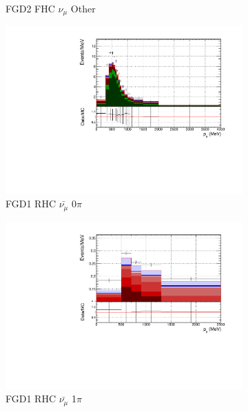 \begin{figure}
\begin{subfigure}{.32\textwidth}
  \caption{FGD2 FHC $\nu_{\mu}$ Other}
  \label{fig:pstack_FGD2_numuCC_other}
\end{subfigure}
\centering
\begin{subfigure}{.32\textwidth}
  \centering
  \includegraphics[width=0.95\linewidth]{figs/FGD1_anti-numuCC_0pi_p}
  \caption{FGD1 RHC $\bar{\nu_{\mu}}$ 0$\pi$}
  \label{fig:pstack_FGD1_anti-numuCC_0pi}
\end{subfigure}
\begin{subfigure}{.32\textwidth}
  \centering
  \includegraphics[width=0.95\linewidth]{figs/FGD1_anti-numuCC_1pi_p}
  \caption{FGD1 RHC $\bar{\nu_{\mu}}$ 1$\pi$}
  \label{fig:pstack_pstack_FGD1_anti-numuCC_1pi}
\end{subfigure}
\begin{subfigure}{.32\textwidth}
  \centering

\end{subfigure}
\end{figure}
